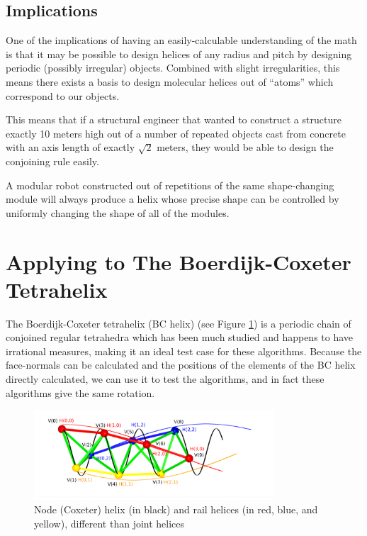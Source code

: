 \documentclass{svproc}
\begin{document}
\subsection{Implications}

One of the implications of having an easily-calculable understanding of the math
is that it may be possible to design helices
of any radius and pitch by designing periodic (possibly irregular) objects.
Combined with slight
irregularities, this means there exists a basis to design molecular helices
out of ``atoms'' which correspond to our objects.

This means that if a structural engineer that wanted to construct a structure exactly 10 meters high
out of a number of repeated objects cast from concrete with an axis length of  exactly $\sqrt{2}$ meters,
they would be able to design the conjoining rule easily.

A modular robot constructed out of repetitions of the same shape-changing module will always
produce a helix
whose precise shape can be controlled by uniformly changing the shape of all of the modules.

\section{Applying to The Boerdijk-Coxeter Tetrahelix}


The Boerdijk-Coxeter tetrahelix (BC helix) (see Figure \ref{fig:helixnodes}) is a periodic chain of conjoined regular tetrahedra
which has been much studied\cite{coxeter1985simplicial,sadler2019periodic,fuller1982synergetics,read2018transforming}
and happens to have irrational measures, making it an ideal
test case for these algorithms. Because the face-normals can be calculated and the
positions of the elements of the BC helix directly calculated, we can use
it to test the algorithms, and in fact these algorithms give the same rotation.


\begin{figure}
     \centering
     \includegraphics[width=0.80\textwidth]{figures/UnifiedDrawing.png}
     \caption{Node (Coxeter) helix (in black) and rail helices (in red, blue, and yellow),
       different than joint helices}
  \label{fig:helixnodes}
\end{figure}
\end{document}
